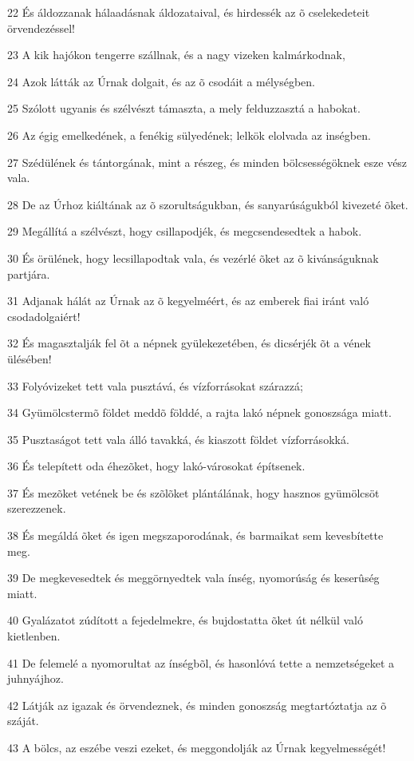 \par 22 És áldozzanak hálaadásnak áldozataival, és hirdessék az õ cselekedeteit örvendezéssel!
\par 23 A kik hajókon tengerre szállnak, és a nagy vizeken kalmárkodnak,
\par 24 Azok látták az Úrnak dolgait, és az õ csodáit a mélységben.
\par 25 Szólott ugyanis és szélvészt támaszta, a mely felduzzasztá a habokat.
\par 26 Az égig emelkedének, a fenékig sülyedének; lelkök elolvada az inségben.
\par 27 Szédülének és tántorgának, mint a részeg, és minden bölcsességöknek esze vész vala.
\par 28 De az Úrhoz kiáltának az õ szorultságukban, és sanyarúságukból kivezeté õket.
\par 29 Megállítá a szélvészt, hogy csillapodjék, és megcsendesedtek a habok.
\par 30 És örülének, hogy lecsillapodtak vala, és vezérlé õket az õ kivánságuknak partjára.
\par 31 Adjanak hálát az Úrnak az õ kegyelméért, és az emberek fiai iránt való csodadolgaiért!
\par 32 És magasztalják fel õt a népnek gyülekezetében, és dicsérjék õt a vének ülésében!
\par 33 Folyóvizeket tett vala pusztává, és vízforrásokat szárazzá;
\par 34 Gyümölcstermõ földet meddõ földdé, a rajta lakó népnek gonoszsága miatt.
\par 35 Pusztaságot tett vala álló tavakká, és kiaszott földet vízforrásokká.
\par 36 És telepített oda éhezõket, hogy lakó-városokat építsenek.
\par 37 És mezõket vetének be és szõlõket plántálának, hogy hasznos gyümölcsöt szerezzenek.
\par 38 És megáldá õket és igen megszaporodának, és barmaikat sem kevesbítette meg.
\par 39 De megkevesedtek és meggörnyedtek vala ínség, nyomorúság és keserûség miatt.
\par 40 Gyalázatot zúdított a fejedelmekre, és bujdostatta õket út nélkül való kietlenben.
\par 41 De felemelé a nyomorultat az ínségbõl, és hasonlóvá tette a nemzetségeket a juhnyájhoz.
\par 42 Látják az igazak és örvendeznek, és minden gonoszság megtartóztatja az õ száját.
\par 43 A bölcs, az eszébe veszi ezeket, és meggondolják az Úrnak kegyelmességét!

